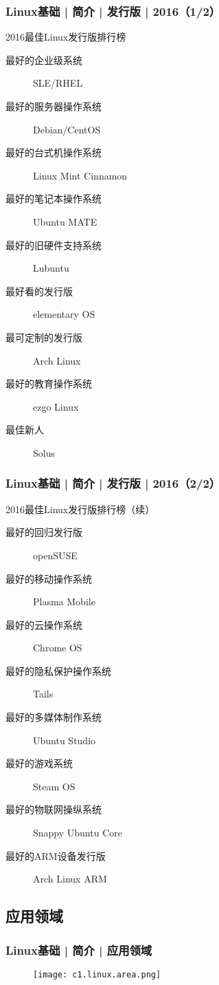 \begin{frame}
  \frametitle{Linux基础 | 简介 | 发行版 | 2016（1/2）}
  \begin{block}{2016最佳Linux发行版排行榜}
  \begin{description}
    \item[最好的企业级系统] SLE/RHEL
    \item[最好的服务器操作系统] Debian/CentOS
    \item[最好的台式机操作系统] Linux Mint Cinnamon
    \item[最好的笔记本操作系统] Ubuntu MATE
    \item[最好的旧硬件支持系统] Lubuntu
    \item[最好看的发行版] elementary OS
    \item[最可定制的发行版] Arch Linux
    \item[最好的教育操作系统] ezgo Linux
    \item[最佳新人] Solus
  \end{description}
  \end{block}
\end{frame}

\begin{frame}
  \frametitle{Linux基础 | 简介 | 发行版 | 2016（2/2）}
  \begin{block}{2016最佳Linux发行版排行榜（续）}
  \begin{description}
    \item[最好的回归发行版] openSUSE
    \item[最好的移动操作系统] Plasma Mobile
    \item[最好的云操作系统] Chrome OS
    \item[最好的隐私保护操作系统] Tails
    \item[最好的多媒体制作系统] Ubuntu Studio
    \item[最好的游戏系统] Steam OS
    \item[最好的物联网操纵系统] Snappy Ubuntu Core
    \item[最好的ARM设备发行版] Arch Linux ARM
  \end{description}
  \end{block}
\end{frame}

\subsection{应用领域}
\begin{frame}
  \frametitle{Linux基础 | 简介 | 应用领域}
  \begin{figure}
    \centering
    \texttt{[image: c1.linux.area.png]}
  \end{figure}
\end{frame}

